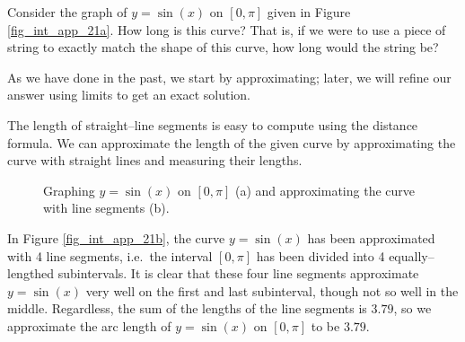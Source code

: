 Consider the graph of $y=\sin(x)$ on $[0,\pi]$ given in Figure \ref{fig_int_app_21a}. How long is this curve? That is, if we were to use a piece of string to exactly match the shape of this curve, how long would the string be?

As we have done in the past, we start by approximating; later, we will refine our answer using limits to get an exact solution.

The length of straight--line segments is easy to compute using the distance formula. We can approximate the length of the given curve by approximating the curve with straight lines and measuring their lengths. 

\begin{figure}
\centering
\qquad
{}
\caption{Graphing $y=\sin(x)$ on $[0,\pi]$ (a) and approximating the curve with line segments (b).}
\end{figure}

In Figure \ref{fig_int_app_21b}, the curve $y=\sin(x)$ has been approximated with 4 line segments, i.e.\ the interval $[0,\pi]$ has been divided into 4 equally--lengthed subintervals. It is clear that these four line segments approximate $y=\sin(x)$ very well on the first and last subinterval, though not so well in the middle. Regardless, the sum of the lengths of the line segments is $3.79$, so we approximate the arc length of $y=\sin(x)$ on $[0,\pi]$ to be $3.79$. 


